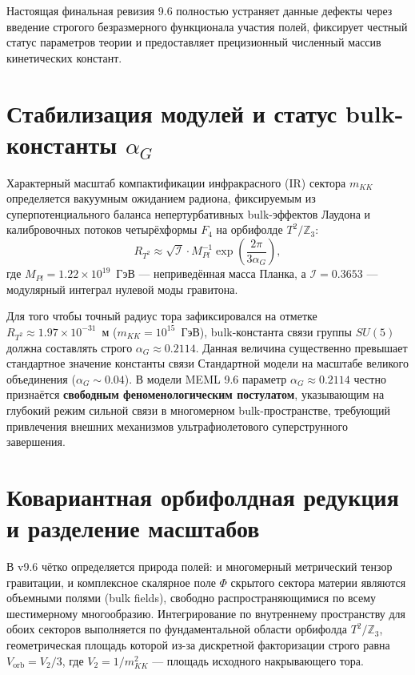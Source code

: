 \documentclass[12pt,a4paper]{article}
\begin{document}
Настоящая финальная ревизия 9.6 полностью устраняет данные дефекты через введение строгого безразмерного функционала участия полей, фиксирует честный статус параметров теории и предоставляет прецизионный численный массив кинетических констант.

\section{Стабилизация модулей и статус bulk-константы $\alpha_G$}
Характерный масштаб компактификации инфракрасного (IR) сектора $m_{KK}$ определяется вакуумным ожиданием радиона, фиксируемым из суперпотенциального баланса непертурбативных bulk-эффектов Лаудона и калибровочных потоков четырёхформы $F_4$ на орбифолде $T^2/\mathbb{Z}_3$:
\begin{equation}
R_{T^2} \approx \sqrt{\mathcal{I}} \cdot M_{Pl}^{-1} \exp\left(\frac{2\pi}{3\alpha_G}\right),
\label{eq:radion}
\end{equation}
где $M_{Pl} = 1.22 \times 10^{19}$~ГэВ --- неприведённая масса Планка, а $\mathcal{I} = 0.3653$ --- модулярный интеграл нулевой моды гравитона.

Для того чтобы точный радиус тора зафиксировался на отметке $R_{T^2} \approx 1.97 \times 10^{-31}$~м ($m_{KK} = 10^{15}$~ГэВ), bulk-константа связи группы $SU(5)$ должна составлять строго $\alpha_G \approx 0.2114$. Данная величина существенно превышает стандартное значение константы связи Стандартной модели на масштабе великого объединения ($\alpha_{G} \sim 0.04$). В модели MEML 9.6 параметр $\alpha_G \approx 0.2114$ честно признаётся \textbf{свободным феноменологическим постулатом}, указывающим на глубокий режим сильной связи в многомерном bulk-пространстве, требующий привлечения внешних механизмов ультрафиолетового суперструнного завершения.

\section{Ковариантная орбифолдная редукция и разделение масштабов}
В v9.6 чётко определяется природа полей: и многомерный метрический тензор гравитации, и комплексное скалярное поле $\Phi$ скрытого сектора материи являются объемными полями (bulk fields), свободно распространяющимися по всему шестимерному многообразию. Интегрирование по внутреннему пространству для обоих секторов выполняется по фундаментальной области орбифолда $T^2/\mathbb{Z}_3$, геометрическая площадь которой из-за дискретной факторизации строго равна $V_{\text{orb}} = V_2 / 3$, где $V_2 = 1/m_{KK}^2$ --- площадь исходного накрывающего тора.
\end{document}
